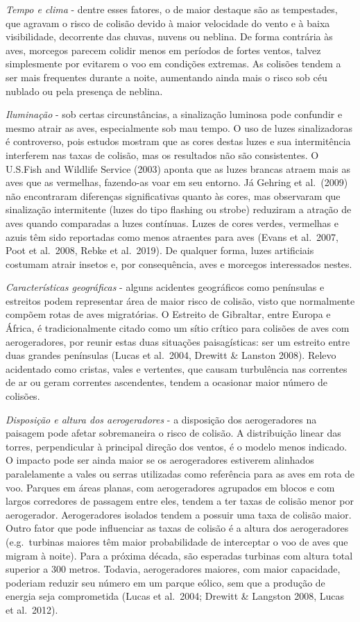 \documentclass[
]{scrbook}
\begin{document}
\emph{Tempo e clima} - dentre esses fatores, o de maior destaque são as tempestades, que agravam o risco de colisão devido à maior velocidade do vento e à baixa visibilidade, decorrente das chuvas, nuvens ou neblina. De forma contrária às aves, morcegos parecem colidir menos em períodos de fortes ventos, talvez simplesmente por evitarem o voo em condições extremas. As colisões tendem a ser mais frequentes durante a noite, aumentando ainda mais o risco sob céu nublado ou pela presença de neblina.

\emph{Iluminação} - sob certas circunstâncias, a sinalização luminosa pode confundir e mesmo atrair as aves, especialmente sob mau tempo. O uso de luzes sinalizadoras é controverso, pois estudos mostram que as cores destas luzes e sua intermitência interferem nas taxas de colisão, mas os resultados não são consistentes. O U.S.Fish and Wildlife Service (2003) aponta que as luzes brancas atraem mais as aves que as vermelhas, fazendo-as voar em seu entorno. Já Gehring et al.~(2009) não encontraram diferenças significativas quanto às cores, mas observaram que sinalização intermitente (luzes do tipo flashing ou strobe) reduziram a atração de aves quando comparadas a luzes contínuas. Luzes de cores verdes, vermelhas e azuis têm sido reportadas como menos atraentes para aves (Evans et al.~2007, Poot et al.~2008, Rebke et al.~2019). De qualquer forma, luzes artificiais costumam atrair insetos e, por consequência, aves e morcegos interessados nestes.

\emph{Características geográficas} - alguns acidentes geográficos como penínsulas e estreitos podem representar área de maior risco de colisão, visto que normalmente compõem rotas de aves migratórias. O Estreito de Gibraltar, entre Europa e África, é tradicionalmente citado como um sítio crítico para colisões de aves com aerogeradores, por reunir estas duas situações paisagísticas: ser um estreito entre duas grandes penínsulas (Lucas et al.~2004, Drewitt \& Lanston 2008). Relevo acidentado como cristas, vales e vertentes, que causam turbulência nas correntes de ar ou geram correntes ascendentes, tendem a ocasionar maior número de colisões.

\emph{Disposição e altura dos aerogeradores} - a disposição dos aerogeradores na paisagem pode afetar sobremaneira o risco de colisão. A distribuição linear das torres, perpendicular à principal direção dos ventos, é o modelo menos indicado. O impacto pode ser ainda maior se os aerogeradores estiverem alinhados paralelamente a vales ou serras utilizadas como referência para as aves em rota de voo. Parques em áreas planas, com aerogeradores agrupados em blocos e com largos corredores de passagem entre eles, tendem a ter taxas de colisão menor por aerogerador. Aerogeradores isolados tendem a possuir uma taxa de colisão maior. Outro fator que pode influenciar as taxas de colisão é a altura dos aerogeradores (e.g.~turbinas maiores têm maior probabilidade de interceptar o voo de aves que migram à noite). Para a próxima década, são esperadas turbinas com altura total superior a 300 metros. Todavia, aerogeradores maiores, com maior capacidade, poderiam reduzir seu número em um parque eólico, sem que a produção de energia seja comprometida (Lucas et al.~2004; Drewitt \& Langston 2008, Lucas et al.~2012).
\end{document}
